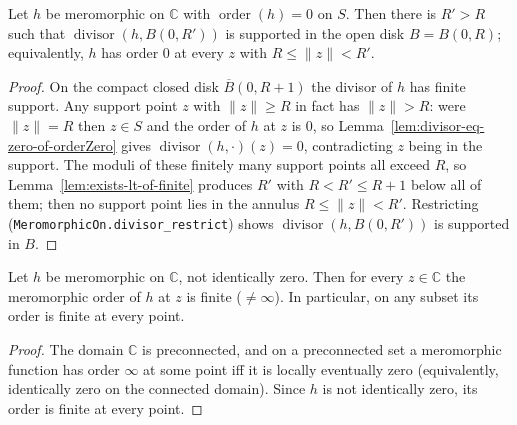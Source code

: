 \begin{lemma}
    \label{lem:annulus-zero-free}
    \leanok
    Let $h$ be meromorphic on $\mathbb{C}$ with $\operatorname{order}(h) = 0$ on
    $S$. Then there is $R' > R$ such that $\operatorname{divisor}(h, B(0,R'))$ is
    supported in the open disk $B = B(0,R)$; equivalently, $h$ has order $0$ at
    every $z$ with $R \le \|z\| < R'$.
\end{lemma}
\begin{proof}
    On the compact closed disk $\overline{B}(0,R+1)$ the divisor of $h$ has finite
    support. Any support point $z$ with $\|z\| \ge R$ in fact has $\|z\| > R$:
    were $\|z\| = R$ then $z \in S$ and the order of $h$ at $z$ is $0$, so
    Lemma~\ref{lem:divisor-eq-zero-of-orderZero} gives
    $\operatorname{divisor}(h,\cdot)(z) = 0$, contradicting $z$ being in the
    support. The moduli of these finitely many support points all exceed $R$, so
    Lemma~\ref{lem:exists-lt-of-finite} produces $R'$ with $R < R' \le R+1$ below
    all of them; then no support point lies in the annulus $R \le \|z\| < R'$.
    Restricting (\texttt{MeromorphicOn.divisor\_restrict}) shows
    $\operatorname{divisor}(h, B(0,R'))$ is supported in $B$.
\end{proof}

\begin{lemma}
    \label{lem:order-ne-top}
    \leanok
    Let $h$ be meromorphic on $\mathbb{C}$, not identically zero. Then for every
    $z \in \mathbb{C}$ the meromorphic order of $h$ at $z$ is finite
    ($\neq \infty$). In particular, on any subset its order is finite at every
    point.
\end{lemma}
\begin{proof}
    The domain $\mathbb{C}$ is preconnected, and on a preconnected set a
    meromorphic function has order $\infty$ at some point iff it is locally
    eventually zero (equivalently, identically zero on the connected domain).
    Since $h$ is not identically zero, its order is finite at every point.
\end{proof}

